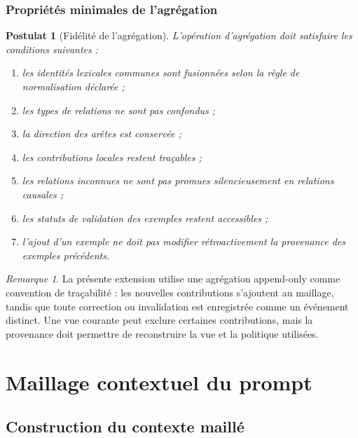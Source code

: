 \documentclass[11pt,a4paper,oneside]{book}
\newtheorem{postulat}[definition]{Postulat}
\theoremstyle{remark}
\newtheorem{remarque}[definition]{Remarque}
\begin{document}
\section{Propriétés minimales de l'agrégation}

\begin{postulat}[Fidélité de l'agrégation]
L'opération d'agrégation doit satisfaire les conditions suivantes :

\begin{enumerate}
  \item les identités lexicales communes sont fusionnées selon
        la règle de normalisation déclarée ;
  \item les types de relations ne sont pas confondus ;
  \item la direction des arêtes est conservée ;
  \item les contributions locales restent traçables ;
  \item les relations inconnues ne sont pas promues silencieusement
        en relations causales ;
  \item les statuts de validation des exemples restent accessibles ;
  \item l'ajout d'un exemple ne doit pas modifier rétroactivement
        la provenance des exemples précédents.
\end{enumerate}
\end{postulat}

\begin{remarque}
La présente extension utilise une agrégation append-only comme
convention de traçabilité : les nouvelles contributions s'ajoutent
au maillage, tandis que toute correction ou invalidation est
enregistrée comme un événement distinct. Une vue courante peut
exclure certaines contributions, mais la provenance doit permettre
de reconstruire la vue et la politique utilisées.
\end{remarque}


\part{Maillage contextuel du prompt}

\chapter{Construction du contexte maillé}
\end{document}
